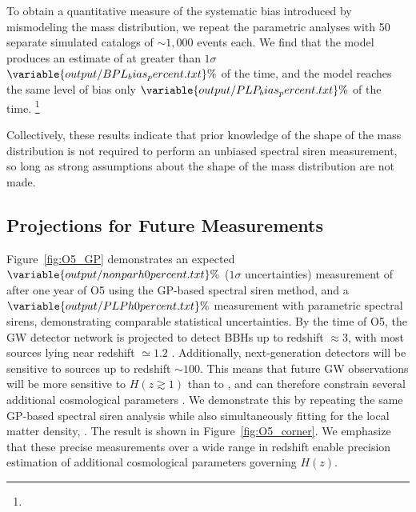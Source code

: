 \documentclass[preprint2,linenumbers]{aastex631}
\begin{document}
To obtain a quantitative measure of the systematic bias introduced by mismodeling the mass distribution, we repeat the parametric analyses with 50 separate simulated catalogs of $\sim1,000$ events each.
We find that the \bpl{} model produces an estimate of \Ho{} at greater than $1\sigma$ $\variable{output/BPL_bias_percent.txt}\%$ of the time, %
and the \plp{} model reaches the same level of bias only $\variable{output/PLP_bias_percent.txt}\%$ 
of the time.
\footnote{}

Collectively, these results indicate that prior knowledge of the shape of the mass distribution is not required to perform an unbiased spectral siren measurement, so long as strong assumptions about the shape of the mass distribution are not made.

\subsection{Projections for Future Measurements}
Figure~\ref{fig:O5_GP} demonstrates an expected $\variable{output/nonparh0percent.txt}\%$ ($1\sigma$ uncertainties) measurement of \Ho{} after one year of \ac{O5} using the \ac{GP}-based spectral siren method, and a $\variable{output/PLPh0percent.txt}\%$ measurement with parametric spectral sirens, demonstrating comparable statistical uncertainties.
By the time of \ac{O5}, the \ac{GW} detector network is projected to detect \acp{BBH} up to redshift $\approx 3$, with most sources lying near redshift $\simeq 1.2$ \citep{chen_distance_2021}.
Additionally, next-generation detectors will be sensitive to sources up to redshift $\sim 100$.
This means that future \ac{GW} observations will be more sensitive to $H(z\gtrsim1)$ than to \Ho, and can therefore constrain several additional cosmological parameters \citep{Chen:2024gdn}.
We demonstrate this by repeating the same \ac{GP}-based spectral siren analysis while also simultaneously fitting for the local matter density, \Omm.
The result is shown in Figure~\ref{fig:O5_corner}.
We emphasize that these precise measurements over a wide range in redshift enable precision estimation of additional cosmological parameters governing $H(z)$.
\end{document}
